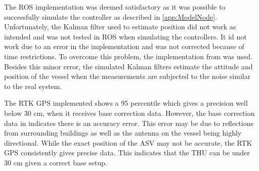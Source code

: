 The ROS implementation was deemed satisfactory as it was possible to successfully simulate the controller as described in \autoref{app:ModelNode}. Unfortunately, the Kalman filter used to estimate position did not work as intended and was not tested in ROS when simulating the controllers. It id not work due to an error in the implementation and was not corrected because of time restrictions. To overcome this problem, the implementation from \cite{thesis} was used. Besides this minor error, the simulated Kalman filters estimate the attitude and position of the vessel when the measurements are subjected to the noise similar to the real system.

The RTK GPS implemented shows a 95 percentile which gives a precision well below 30 cm, when it receives base correction data. However, the base correction data in  indicates there is an accuracy error. This error may be due to reflections from surrounding buildings as well as the antenna on the vessel being highly directional. While the exact position of the ASV may not be accurate, the RTK GPS consistently gives precise data.
This indicates that the THU can be under 30 cm given a correct base setup.
